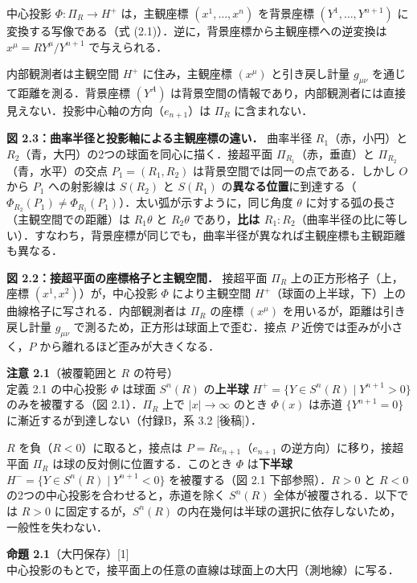 \documentclass[a4paper,11pt]{ltjsarticle}
\theoremstyle{definition}
\begin{document}
中心投影 \(\Phi: \Pi_R \to H^+\) は，主観座標 \((x^1, \ldots, x^n)\) を背景座標 \((Y^1, \ldots, Y^{n+1})\) に変換する写像である（式 (2.1)）．逆に，背景座標から主観座標への逆変換は \(x^\mu = RY^\mu/Y^{n+1}\) で与えられる．

内部観測者は主観空間 \(H^+\) に住み，主観座標 \((x^\mu)\) と引き戻し計量 \(g_{\mu\nu}\) を通じて距離を測る．背景座標 \((Y^A)\) は背景空間の情報であり，内部観測者には直接見えない．投影中心軸の方向（\(e_{n+1}\)）は \(\Pi_R\) に含まれない．

\textbf{図 2.3：曲率半径と投影軸による主観座標の違い．} 曲率半径 \(R_1\)（赤，小円）と \(R_2\)（青，大円）の2つの球面を同心に描く．接超平面 \(\Pi_{R_1}\)（赤，垂直）と \(\Pi_{R_2}\)（青，水平）の交点 \(P_1 = (R_1, R_2)\) は背景空間では同一の点である．しかし \(O\) から \(P_1\) への射影線は \(S(R_2)\) と \(S(R_1)\) の\textbf{異なる位置}に到達する（\(\Phi_{R_2}(P_1) \neq \Phi_{R_1}(P_1)\)）．太い弧が示すように，同じ角度 \(\theta\) に対する弧の長さ（主観空間での距離）は \(R_1\theta\) と \(R_2\theta\) であり，\textbf{比は \(R_1 : R_2\)}（曲率半径の比に等しい）．すなわち，背景座標が同じでも，曲率半径が異なれば主観座標も主観距離も異なる．

\textbf{図 2.2：接超平面の座標格子と主観空間．} 接超平面 \(\Pi_R\) 上の正方形格子（上，座標 \((x^1, x^2)\)）が，中心投影 \(\Phi\) により主観空間 \(H^+\)（球面の上半球，下）上の曲線格子に写される．内部観測者は \(\Pi_R\) の座標 \((x^\mu)\) を用いるが，距離は引き戻し計量 \(g_{\mu\nu}\) で測るため，正方形は球面上で歪む．接点 \(P\) 近傍では歪みが小さく，\(P\) から離れるほど歪みが大きくなる．

\textbf{注意 2.1}（被覆範囲と \(R\) の符号）\\
定義 2.1 の中心投影 \(\Phi\) は球面 \(S^n(R)\) の\textbf{上半球} \(H^+ = \{Y \in S^n(R) \mid Y^{n+1} > 0\}\) のみを被覆する（図 2.1）．\(\Pi_R\) 上で \(|x| \to \infty\) のとき \(\Phi(x)\) は赤道 \(\{Y^{n+1} = 0\}\) に漸近するが到達しない（付録B，系 3.2 {[}後稿{]}）．

\(R\) を負（\(R < 0\)）に取ると，接点は \(P = Re_{n+1}\)（\(e_{n+1}\) の逆方向）に移り，接超平面 \(\Pi_R\) は球の反対側に位置する．このとき \(\Phi\) は\textbf{下半球} \(H^- = \{Y \in S^n(R) \mid Y^{n+1} < 0\}\) を被覆する（図 2.1 下部参照）．\(R > 0\) と \(R < 0\) の2つの中心投影を合わせると，赤道を除く \(S^n(R)\) 全体が被覆される．以下では \(R > 0\) に固定するが，\(S^n(R)\) の内在幾何は半球の選択に依存しないため，一般性を失わない．

\textbf{命題 2.1}（大円保存）{[}1{]}\\
中心投影のもとで，接平面上の任意の直線は球面上の大円（測地線）に写る．
\end{document}
